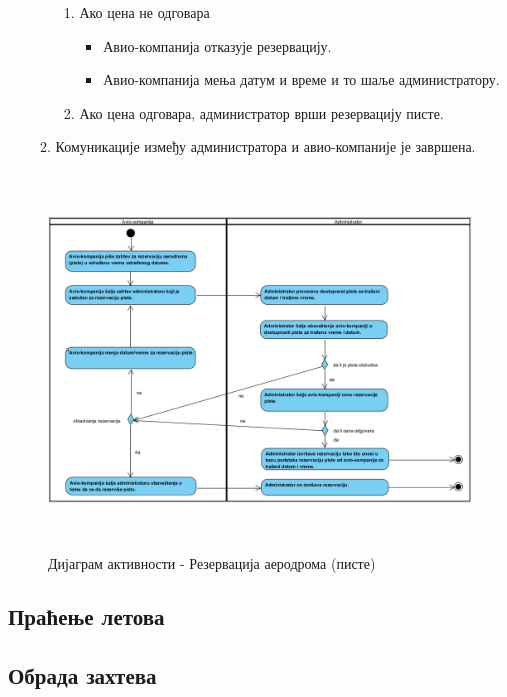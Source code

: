 \documentclass{article}
\begin{document}
\begin{itemize}
\begin{enumerate}
                 \begin{enumerate}
                    \item Ако цена не одговара 
                        \begin{itemize}
                            \item Авио-компанија отказује резервацију.
                            \item Авио-компанија мења датум и време и то шаље администратору.
                        \end{itemize}
                    \item Ако цена одговара, администратор врши резервацију писте.
                \end{enumerate}
        \item Комуникације између администратора и авио-компаније је завршена.
    \end{enumerate}
\end{itemize}

\begin{figure}[H]
    \centering
    \includegraphics[width=1.1\textwidth, height=10cm]{Dijagrami_slike/rezervacija_aerodroma.png}
    \caption{Дијаграм активности - Резервација аеродрома (писте)}
\end{figure}

\subsection{Праћење летова}

\subsection{Обрада захтева}
\end{document}
